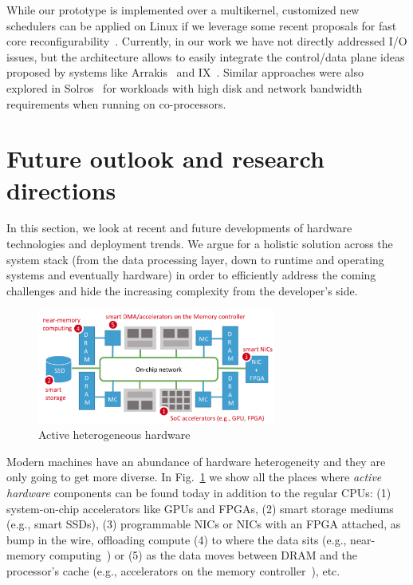 \documentclass[11pt]{article}
\begin{document}
While our prototype is implemented over a multikernel, customized new schedulers can
be applied on Linux if we leverage some recent proposals for fast core 
reconfigurability~\cite{panneerselvam:atc15}. Currently, in our work we have not directly addressed I/O
issues, but the architecture allows to easily integrate the control/data plane 
ideas proposed by systems like Arrakis~\cite{Peter:osdi14} and IX~\cite{IX}. Similar 
approaches were also explored in Solros~\cite{solros} for workloads with high disk 
and network bandwidth requirements when running on co-processors.

% 

\section{Future outlook and research directions}

In this section, we look at recent and future developments of hardware technologies 
and deployment trends. We argue for a holistic solution across the system stack 
(from the data processing layer, down to runtime and operating systems and eventually 
hardware) in order to efficiently address the coming challenges and hide the 
increasing complexity from the developer's side.

\begin{figure}[t]
\centering
\includegraphics[width=0.7\textwidth]{figs/active-hw-everywhere-crop.pdf}
\caption{Active heterogeneous hardware}
\label{fig:active_hw}
\end{figure}

Modern machines have an abundance of hardware heterogeneity and they are only going to get 
more diverse. In Fig.~\ref{fig:active_hw} we show all the places where {\it active hardware}
components can be found today in addition to the regular CPUs: (1) system-on-chip 
accelerators like GPUs and FPGAs, (2) smart storage mediums (e.g., smart SSDs), 
(3) programmable NICs or NICs with an FPGA attached, as bump in the wire, 
offloading compute (4) to where the data sits (e.g., near-memory 
computing~\cite{PIM}) or (5) as the data moves between DRAM and the 
processor's cache (e.g., accelerators on the memory controller~\cite{aingaran2015m7}), etc.
\end{document}
